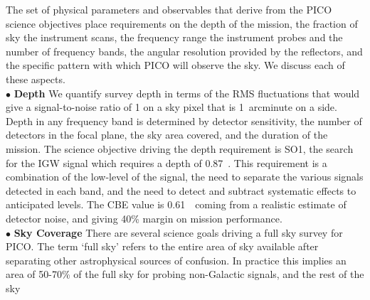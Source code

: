 \documentclass[PICOReport.tex]{subfiles}
\begin{document}
The set of physical parameters and observables that derive from the PICO science objectives place 
requirements on the depth of the mission, the fraction of sky the instrument scans, the frequency range the 
instrument probes and the number of frequency bands, the angular resolution provided by the reflectors, and
the specific pattern with which PICO will observe the sky. We discuss each of these aspects. \\
%
$\bullet$ {\bf Depth} \hspace{0.1in} We quantify survey depth in terms of the RMS fluctuations that would give
a signal-to-noise ratio of 1 on a sky pixel that is 1~arcminute on a side. Depth in any frequency band 
is determined by detector sensitivity, the number of detectors in the focal plane, the sky area covered, and the 
duration of the mission.  The science objective driving 
the depth requirement is SO1, the search for the IGW signal which 
requires a depth of 0.87~\microkamin. This requirement is a combination of the low-level of the signal, the need
to separate the various signals detected in each band, and the need to detect and subtract systematic effects 
to anticipated levels.  The \ac{CBE} value is 0.61~\microkamin\ coming from a realistic estimate of detector noise, and 
giving 40\% margin on mission performance. \\
%
$\bullet$ {\bf Sky Coverage} \hspace{0.1in} There are several science goals driving a full sky survey for PICO. The 
term `full sky' refers to the entire area of sky available after separating other astrophysical sources of confusion. In 
practice this implies an area of 50-70\% of the full sky for probing non-Galactic signals, and the rest of the sky
\end{document}
